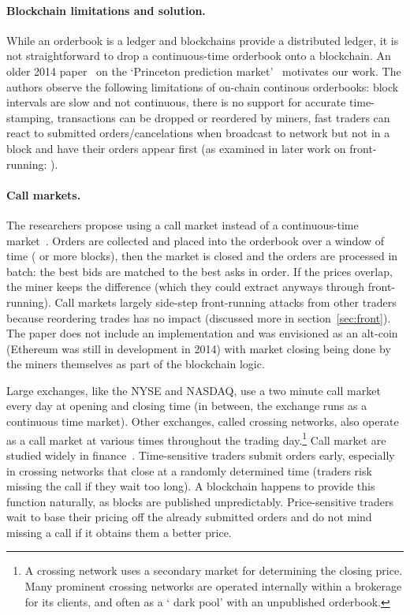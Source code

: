 \paragraph{Blockchain limitations and solution.} While an orderbook is a ledger and blockchains provide a distributed ledger, it is not straightforward to drop a continuous-time orderbook onto a blockchain. An older 2014 paper~\cite{clark2014decentralizing} on the `Princeton prediction market'~\cite{Bra13} motivates our work. The authors observe the following limitations of on-chain continous orderbooks: block intervals are slow and not continuous, there is no support for accurate time-stamping, transactions can be dropped or reordered by miners, fast traders can react to submitted orders/cancelations when broadcast to network but not in a block and have their orders appear first (as examined in later work on front-running: \cite{eskandari2019sok,daian2019flash}).

\paragraph{Call markets.} The researchers propose using a call market instead of a continuous-time market~\cite{clark2014decentralizing}. Orders are collected and placed into the orderbook over a window of time ( or more blocks), then the market is closed and the orders are processed in batch: the best bids are matched to the best asks in order. If the prices overlap, the miner keeps the difference (which they could extract anyways through front-running). Call markets largely side-step front-running attacks from other traders because reordering trades has no impact (discussed more in section~\ref{sec:front}). The paper does not include an implementation and was envisioned as an alt-coin (Ethereum was still in development in 2014) with market closing being done by the miners themselves as part of the blockchain logic.

Large exchanges, like the NYSE and NASDAQ, use a two minute call market every day at opening and closing time (in between, the exchange runs as a continuous time market). Other exchanges, called crossing networks, also operate as a call market at various times throughout the trading day.\footnote{A crossing network uses a secondary market for determining the closing price. Many prominent crossing networks are operated internally within a brokerage for its clients, and often as a `	dark pool' with an unpublished orderbook.} Call market are studied widely in finance~\cite{Har03}. Time-sensitive traders submit orders early, especially in crossing networks that close at a randomly determined time (traders risk missing the call if they wait too long). A blockchain happens to provide this function naturally, as blocks are published unpredictably. Price-sensitive traders wait to base their pricing off the already submitted orders and do not mind missing a call if it obtains them a better price. 







